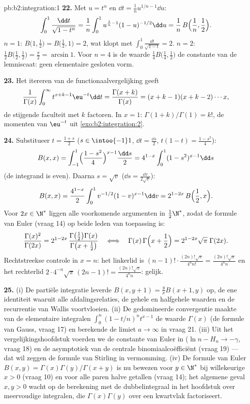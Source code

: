 \begin{solution}{pb:b2:integration:1}
\textbf{22.} Met $u = t^n$ en $\dd t = \frac1n u^{1/n - 1}\dd u$:
\[
\int_0^1 \frac{\dd t}{\sqrt{1-t^n}}
= \frac1n\int_0^1 u^{\frac1n-1}(1-u)^{-1/2}\dd u
= \frac1n\,B\Bigl(\frac1n, \frac12\Bigr) .
\]
$n = 1$: $B\bigl(1,\frac12\bigr) = B\bigl(\frac12,1\bigr) = 2$, wat
klopt met $\int_0^1\frac{\dd t}{\sqrt{1-t}} = 2$. $n = 2$: $\frac12
B\bigl(\frac12,\frac12\bigr) = \frac\pi2 = \arcsin 1$. Voor $n = 4$
is de waarde $\frac14 B\bigl(\frac14,\frac12\bigr)$ de constante
van de lemniscaat: geen elementaire gesloten vorm.

\textbf{23.} Het itereren van de functionaalvergelijking geeft
\[
\frac{1}{\Gamma(x)}\int_0^\infty t^{x+k-1}\eu^{-t}\dd t
= \frac{\Gamma(x+k)}{\Gamma(x)}
= (x+k-1)(x+k-2)\cdots x ,
\]
de stijgende faculteit met $k$ factoren. In $x = 1$:
$\Gamma(1+k)/\Gamma(1) = k!$, de momenten van $\eu^{-t}$ uit
\cref{exo:b2:integration:2}.

\textbf{24.} Substitueer $t = \frac{1+s}2$ ($s \in \intoo{-1}1$,
$\dd t = \frac{\dd s}2$, $t(1-t) = \frac{1-s^2}4$):
\[
B(x,x) = \int_{-1}^{1}\Bigl(\frac{1-s^2}{4}\Bigr)^{x-1}
\frac{\dd s}{2}
= 4^{1-x}\int_0^1 (1-s^2)^{x-1}\dd s
\]
(de integrand is even). Daarna $s = \sqrt v$ ($\dd s = \frac{\dd
v}{2\sqrt v}$):
\[
B(x,x) = \frac{4^{1-x}}{2}\int_0^1
v^{-1/2}(1-v)^{x-1}\dd v
= 2^{1-2x}\,B\Bigl(\frac12, x\Bigr) .
\]
Voor $2x \in \N^*$ liggen alle voorkomende argumenten in
$\frac12\N^*$, zodat de formule van Euler (vraag 14) op beide
leden van toepassing is:
\[
\frac{\Gamma(x)^2}{\Gamma(2x)}
= 2^{1-2x}\,
\frac{\Gamma\bigl(\frac12\bigr)\Gamma(x)}
{\Gamma\bigl(x+\frac12\bigr)}
\quad\Longleftrightarrow\quad
\Gamma(x)\,\Gamma\Bigl(x+\frac12\Bigr)
= 2^{1-2x}\sqrt\pi\;\Gamma(2x) .
\]
Rechtstreekse controle in $x = n$: het linkerlid is $(n-1)!\cdot
\frac{(2n)!\sqrt\pi}{4^n n!} = \frac{(2n)!\sqrt\pi}{4^n n}$ en het
rechterlid $2\cdot4^{-n}\sqrt\pi\,(2n-1)! = \frac{(2n)!\sqrt\pi}{4^n
n}$: gelijk.

\textbf{25.} (i) De partiële integratie leverde $B(x,y+1) = \frac
yx B(x+1,y)$ op, de ene identiteit waaruit alle
afdalingsrelaties, de gehele en halfgehele waarden en de
recurrentie van Wallis voortvloeien. (ii) De gedomineerde
convergentie maakte van de elementaire integralen
$\int_0^n(1-t/n)^n t^{x-1}$ de waarde $\Gamma(x)$ (de formule van
Gauss, vraag 17) en berekende de limiet $a \to \infty$ in vraag 21.
(iii) Uit het vergelijkingshoofdstuk voerden we de constante van
Euler in ($\ln n - H_n \to -\gamma$, vraag 18) en de asymptotiek
van de centrale binomiaalcoëfficiënt (vraag 19) --- dat wil zeggen
de formule van Stirling in vermomming. (iv) De formule van Euler
$B(x,y) = \Gamma(x)\Gamma(y)/\Gamma(x+y)$ is nu bewezen voor $y \in
\N^*$ bij willekeurige $x > 0$ (vraag 10) en voor alle paren halve
getallen (vraag 14); het algemene geval $x, y > 0$ wacht op de
berekening met de dubbelintegraal in het hoofdstuk over
meervoudige integralen, die $\Gamma(x)\Gamma(y)$ over een
kwartvlak factoriseert.
\end{solution}

